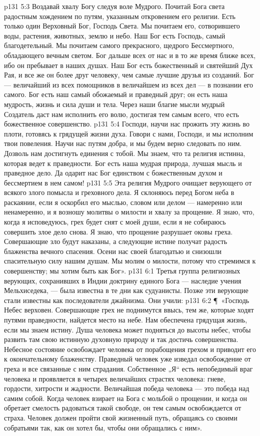\vs p131 5:3 Воздавай хвалу Богу следуя воле Мудрого. Почитай Бога света радостным хождением по путям, указанным откровением его религии. Есть только один Верховный Бог, Господь Света. Мы почитаем его, сотворившего воды, растения, животных, землю и небо. Наш Бог есть Господь, самый благодетельный. Мы почитаем самого прекрасного, щедрого Бессмертного, обладающего вечным светом. Бог дальше всех от нас и в то же время ближе всех, ибо он пребывает в наших душах. Наш Бог есть божественный и святейший Дух Рая, и все же он более друг человеку, чем самые лучшие друзья из созданий. Бог --- величайший из всех помощников в величайшем из всех дел --- в познании его самого. Бог есть наш самый обожаемый и праведный друг; он есть наша мудрость, жизнь и сила души и тела. Через наши благие мысли мудрый Создатель даст нам исполнить его волю, достигая тем самым всего, что есть божественное совершенство.
\vs p131 5:4 Господи, научи нас прожить эту жизнь во плоти, готовясь к грядущей жизни духа. Говори с нами, Господи, и мы исполним твои повеления. Научи нас путям добра, и мы будем верно следовать по ним. Дозволь нам достигнуть единения с тобой. Мы знаем, что та религия истинна, которая ведет к праведности. Бог есть наша мудрая природа, лучшая мысль и праведное дело. Да одарит нас Бог единством с божественным духом и бессмертием в нем самом!
\vs p131 5:5 Эта религия Мудрого очищает верующего от всякого злого помысла и греховного дела. Я склоняюсь перед Богом неба в раскаянии, если я оскорбил его мыслью, словом или делом --- намеренно или ненамеренно, и я возношу молитвы о милости и хвалу за прощение. Я знаю, что, когда я исповедуюсь, грех будет снят с моей души, если я не собираюсь совершить злое дело снова. Я знаю, что прощение разрушает оковы греха. Совершающие зло будут наказаны, а следующие истине получат радость блаженства вечного спасения. Осени нас своей благодатью и снизошли спасительную силу нашим душам. Мы молим о милости, потому что стремимся к совершенству; мы хотим быть как Бог».
\vs p131 6:1 Третья группа религиозных верующих, сохранивших в Индии доктрину единого Бога --- наследие учения Мельхиседека, --- была известна в те дни как судуанисты. Позже эти верующие стали известны как последователи джайнизма. Они учили:
\vs p131 6:2 \P\ «Господь Небес верховен. Совершающие грех не поднимутся ввысь, тем же, которые ходят путями праведности, найдется место на небе. Нам обеспечена грядущая жизнь, если мы знаем истину. Душа человека может подняться до высоты небес, чтобы развить там свою истинную духовную природу и так достичь совершенства. Небесное состояние освобождает человека от порабощения грехом и приводит его к окончательному блаженству. Праведный человек уже изведал освобождение от греха и все связанные с ним страдания. Собственное „Я“ есть непобедимый враг человека и проявляется в четырех величайших страстях человека: гневе, гордости, хитрости и жадности. Величайшая победа человека --- это победа над самим собой. Когда человек взирает на Бога с мольбой о прощении, и когда он обретает смелость радоваться такой свободе, он тем самым освобождается от страха. Человек должен пройти свой жизненный путь, обращаясь со своими собратьями так, как он хотел бы, чтобы они обращались с ним».
